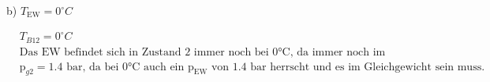 b) \( T_{\text{EW}} = 0^\circ C \)

\[
\begin{aligned}
    &T_{B12} = 0^\circ C \\
    &\text{Das EW befindet sich in Zustand 2 immer noch bei 0°C, da immer noch im zwei-phasen Zustand befindet sich im Gleichgewicht.} \\
    &\text{p}_{g2} = 1.4 \text{ bar, da bei 0°C auch ein p}_{\text{EW}} \text{ von 1.4 bar herrscht und es im Gleichgewicht sein muss.}
\end{aligned}
\]